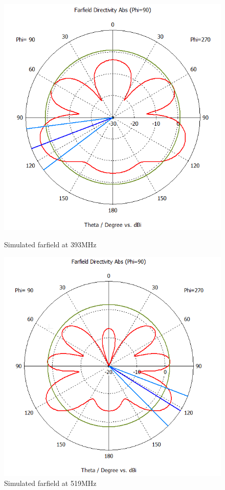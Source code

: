 \begin{figure}[H]
  \centering
  \begin{minipage}[b]{0.5\textwidth}
	\includegraphics[scale = 0.4]{figures/antennas/qha/qha_6_ff_393}
	\caption{Simulated farfield at 393MHz}
    \label{fig:QHA_ff_393}
  \end{minipage}
  \hfill
  \begin{minipage}[b]{0.4\textwidth}
\includegraphics[scale = 0.4]{figures/antennas/qha/qha_6_ff_519}
\caption{Simulated farfield at 519MHz}
    \label{fig:QHA_ff_519}
  \end{minipage}
\end{figure}

